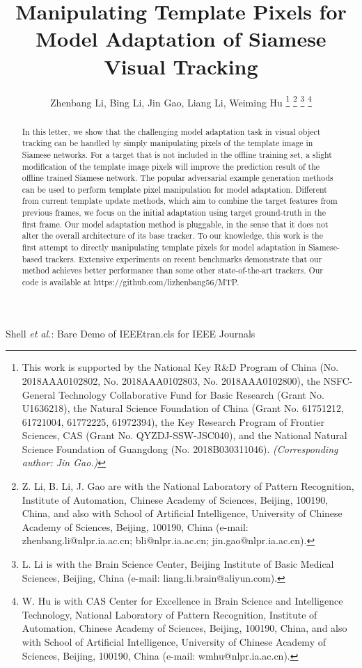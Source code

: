 \documentclass[journal]{IEEEtran}
\begin{document}
\title{Manipulating Template Pixels for Model Adaptation of Siamese Visual Tracking}

\author{Zhenbang Li, Bing Li, Jin Gao, Liang Li, Weiming Hu
\thanks{This work is supported by the National Key R\&D Program of China (No. 2018AAA0102802, No. 2018AAA0102803, No. 2018AAA0102800), the NSFC-General Technology Collaborative Fund for Basic Research (Grant No. U1636218), the Natural Science Foundation of China (Grant No. 61751212, 61721004, 61772225, 61972394), the Key Research Program of Frontier Sciences, CAS (Grant No. QYZDJ-SSW-JSC040), and the National Natural Science Foundation of Guangdong (No. 2018B030311046). \textit{(Corresponding author: Jin Gao.)}}
\thanks{Z. Li, B. Li, J. Gao are with the National Laboratory of Pattern Recognition, Institute of Automation, Chinese Academy of Sciences, Beijing, 100190, China, and also with School of Artificial Intelligence, University of Chinese Academy of Sciences, Beijing, 100190, China (e-mail: zhenbang.li@nlpr.ia.ac.cn; bli@nlpr.ia.ac.cn; jin.gao@nlpr.ia.ac.cn).}
\thanks{L. Li is with the Brain Science Center, Beijing Institute of Basic Medical Sciences, Beijing, China (e-mail: liang.li.brain@aliyun.com).}
\thanks{W. Hu is with CAS Center for Excellence in Brain Science and Intelligence Technology, National Laboratory of Pattern Recognition, Institute of Automation, Chinese Academy of Sciences, Beijing, 100190, China, and also with School of Artificial Intelligence, University of Chinese Academy of Sciences, Beijing, 100190, China (e-mail: wmhu@nlpr.ia.ac.cn).}
}

{Shell \MakeLowercase{\textit{et al.}}: Bare Demo of IEEEtran.cls for IEEE Journals}
\maketitle

\begin{abstract}
In this letter, we show that the challenging model adaptation task in visual object tracking can be handled by simply manipulating pixels of the template image in Siamese networks. For a target that is not included in the offline training set, a slight modification of the template image pixels will improve the prediction result of the offline trained Siamese network. The popular adversarial example generation methods can be used to perform template pixel manipulation for model adaptation. Different from current template update methods, which aim to combine the target features from previous frames, we focus on the initial adaptation using target ground-truth in the first frame. Our model adaptation method is pluggable, in the sense that it does not alter the overall architecture of its base tracker. To our knowledge, this work is the first attempt to directly manipulating template pixels for model adaptation in Siamese-based trackers. Extensive experiments on recent benchmarks demonstrate that our method achieves better performance than some other state-of-the-art trackers. Our code is available at https://github.com/lizhenbang56/MTP.
\end{abstract}
\end{document}
